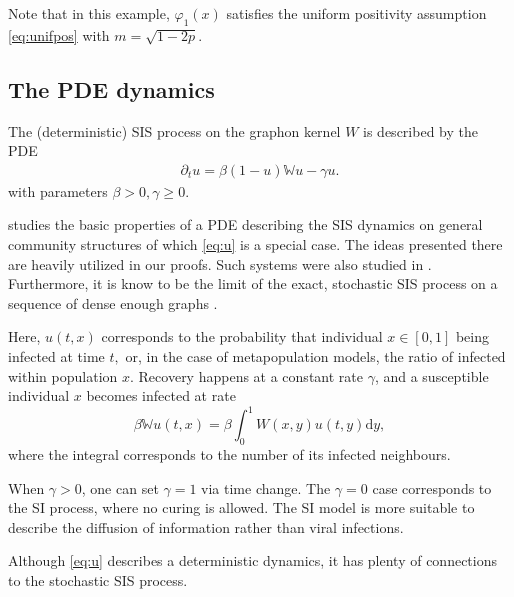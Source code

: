\documentclass{article}
\renewcommand{\d}{\mathrm{d}}
\newcommand{\W}{\mathbb{W}}
\newcommand{\1}[1]{{\mathds{1}}_{\left\{#1\right\}}}
\newcommand{\rem}[1]{{#1}}
\begin{document}
Note that in this example, $\varphi_1(x)$ satisfies the uniform positivity assumption \eqref{eq:unifpos} with $m=\sqrt{1-2p}.$


\subsection{The PDE dynamics}

The (deterministic) SIS process on the graphon kernel $W$ is described by the PDE
\begin{align}
\label{eq:u}
\partial_t u=\beta(1-u)\W u-\gamma u.
\end{align}
with parameters $\beta>0, \gamma \geq 0$. 

\rem{\cite{SISdyn} studies the basic properties of a PDE describing the SIS dynamics on general community structures of which \eqref{eq:u} is a special case. The ideas presented there are heavily utilized in our proofs. Such systems were also studied in \cite{graphongame}. Furthermore, it is know to be the limit of the exact, stochastic SIS process on a sequence of dense enough graphs \cite{Delmas2023, Kuehn2022,Keliger2022}.  }

Here, $u(t,x)$ corresponds to the probability that individual $x \in [0,1]$ being infected at time $t,$ or, in the case of metapopulation models, the ratio of infected within population $x$. Recovery happens at a constant rate $\gamma$, and a susceptible individual $x$ becomes infected at rate
$$ \beta \W u(t,x)=\beta \int_{0}^{1} W(x,y)u(t,y) \d y, $$
where the integral corresponds to the number of its infected neighbours.

When $\gamma>0$, one can set $\gamma=1$ via time change. The $\gamma=0$ case corresponds to the SI process, where no curing is allowed. The SI model is more suitable to describe the diffusion of information rather than viral infections.

Although \eqref{eq:u} describes a deterministic dynamics, it has plenty of connections to the stochastic SIS process.
\end{document}
